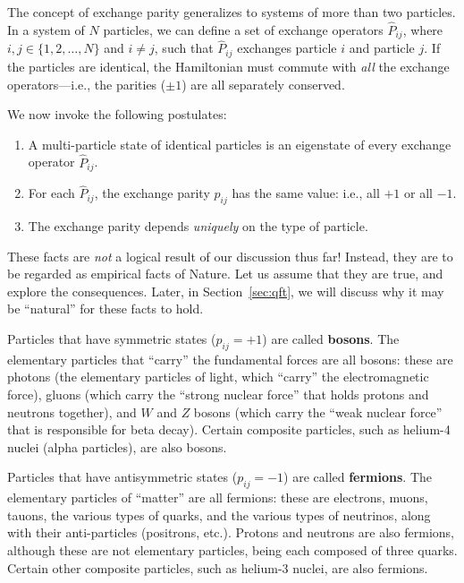 \documentclass[pra,12pt]{revtex4}
\begin{document}
The concept of exchange parity generalizes to systems of more than two
particles.  In a system of $N$ particles, we can define a set of
exchange operators $\hat{P}_{ij}$, where $i,j\in\{1,2,\dots,N\}$ and
$i\ne j$, such that $\hat{P}_{ij}$ exchanges particle $i$ and particle
$j$.  If the particles are identical, the Hamiltonian must commute
with \textit{all} the exchange operators---i.e., the parities ($\pm
1$) are all separately conserved.

We now invoke the following postulates:
\begin{enumerate}
\item A multi-particle state of identical particles is an eigenstate
  of every exchange operator $\hat{P}_{ij}$.

\item For each $\hat{P}_{ij}$, the exchange parity $p_{ij}$ has the
  same value: i.e., all $+1$ or all $-1$.

\item The exchange parity depends \textit{uniquely} on the type of
  particle.
\end{enumerate}
These facts are \textit{not} a logical result of our discussion thus
far!  Instead, they are to be regarded as empirical facts of Nature.
Let us assume that they are true, and explore the consequences.
Later, in Section~\ref{sec:qft}, we will discuss why it may be
``natural'' for these facts to hold.

Particles that have symmetric states ($p_{ij} = +1$) are called
\textbf{bosons}.  The elementary particles that ``carry'' the
fundamental forces are all bosons: these are photons (the elementary
particles of light, which ``carry'' the electromagnetic force), gluons
(which carry the ``strong nuclear force'' that holds protons and
neutrons together), and $W$ and $Z$ bosons (which carry the ``weak
nuclear force'' that is responsible for beta decay).  Certain
composite particles, such as helium-4 nuclei (alpha particles), are
also bosons.

Particles that have antisymmetric states ($p_{ij} = -1$) are called
\textbf{fermions}.  The elementary particles of ``matter'' are all
fermions: these are electrons, muons, tauons, the various types of
quarks, and the various types of neutrinos, along with their
anti-particles (positrons, etc.).  Protons and neutrons are also
fermions, although these are not elementary particles, being each
composed of three quarks.  Certain other composite particles, such as
helium-3 nuclei, are also fermions.
\end{document}
